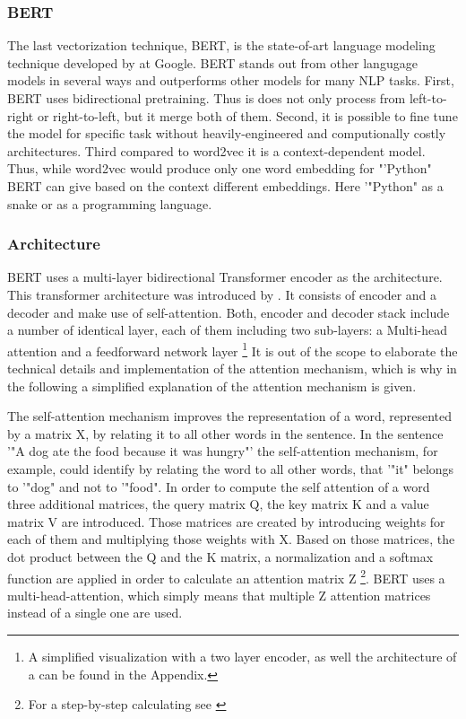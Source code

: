 \documentclass[12pt, a4paper, titlepage]{article}
\begin{document}
\subsubsection*{BERT}
The last vectorization technique, \ac{BERT}, is the state-of-art language modeling technique developed by \citep{devlin2018} at Google. \ac{BERT} stands out from other langugage models in several ways and outperforms other models for many \ac{NLP} tasks. First, \ac{BERT} uses bidirectional pretraining. Thus is does not only process from left-to-right or right-to-left, but it merge both of them. Second, it is possible to fine tune the model for specific task without heavily-engineered and computionally costly architectures. Third compared to word2vec it is a context-dependent model. Thus, while word2vec would produce only one word embedding for "'Python" \ac{BERT} can give based on the context different embeddings. Here '"Python" as a snake or as a programming language. 

\subsubsection*{Architecture}
\ac{BERT} uses a multi-layer bidirectional Transformer encoder as the architecture. This transformer architecture was introduced by \citet{vaswani2017}. It consists of encoder and a decoder and make use of self-attention. Both, encoder and decoder stack include a number of identical layer, each of them including two sub-layers: a Multi-head attention and a feedforward network layer \footnote{A simplified visualization with a two layer encoder, as well the architecture of a  can be found in the Appendix.} It is out of the scope to elaborate the technical details and implementation of the attention mechanism, which is why in the following a simplified explanation of the attention mechanism is given. 

The self-attention mechanism improves the representation of a word, represented by a matrix X, by relating it to all other words in the sentence. In the sentence '"A dog ate the food because it was hungry"' \citep[10]{ravichandiran2021} the self-attention mechanism, for example, could identify by relating the word to all other words, that '"it" belongs to '"dog" and not to '"food". 
In order to compute the self attention of a word three additional matrices, the query matrix Q, the key matrix K and a value matrix V are introduced. Those matrices are created by introducing weights for each of them and multiplying those weights with X. Based on those matrices, the dot product between the Q and the K matrix, a normalization and a softmax function are applied in order to calculate an attention matrix Z  \footnote{For a step-by-step calculating see \citep{ravichandiran2021}}. \ac{BERT} uses a multi-head-attention, which simply means that multiple Z attention matrices instead of a single one are used.
\end{document}
